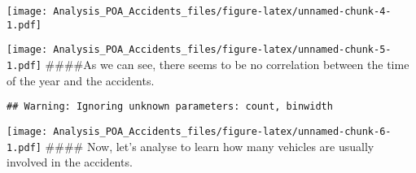 \documentclass[]{article}
\newenvironment{Shaded}{\begin{snugshade}}{\end{snugshade}}
\newcommand{\KeywordTok}[1]{\textcolor[rgb]{0.13,0.29,0.53}{\textbf{#1}}}
\newcommand{\DataTypeTok}[1]{\textcolor[rgb]{0.13,0.29,0.53}{#1}}
\newcommand{\DecValTok}[1]{\textcolor[rgb]{0.00,0.00,0.81}{#1}}
\newcommand{\StringTok}[1]{\textcolor[rgb]{0.31,0.60,0.02}{#1}}
\newcommand{\OperatorTok}[1]{\textcolor[rgb]{0.81,0.36,0.00}{\textbf{#1}}}
\newcommand{\NormalTok}[1]{#1}
\begin{document}
\texttt{[image: Analysis\_POA\_Accidents\_files/figure-latex/unnamed-chunk-4-1.pdf]}

\begin{Shaded}
\end{Shaded}

\texttt{[image: Analysis\_POA\_Accidents\_files/figure-latex/unnamed-chunk-5-1.pdf]}
\#\#\#\#As we can see, there seems to be no correlation between the time
of the year and the accidents.

\begin{Shaded}
\end{Shaded}

\begin{verbatim}
## Warning: Ignoring unknown parameters: count, binwidth
\end{verbatim}

\texttt{[image: Analysis\_POA\_Accidents\_files/figure-latex/unnamed-chunk-6-1.pdf]}
\#\#\#\# Now, let's analyse to learn how many vehicles are usually
involved in the accidents.

\begin{Shaded}
\end{Shaded}
\end{document}
